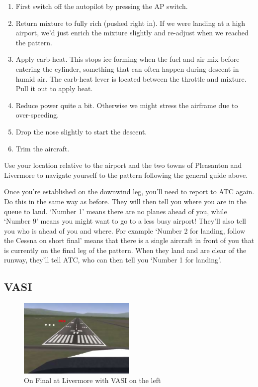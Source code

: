 \begin{enumerate}
\item First switch off the autopilot by pressing the AP switch.

\item Return mixture to fully rich (pushed right in). If we were landing at a
high airport, we'd just enrich the mixture slightly and re-adjust when we reached the pattern.

\item Apply carb-heat. This stops ice forming when the fuel and air mix before
entering the cylinder, something that can often happen during descent in humid air.
The carb-heat lever is located between the throttle and mixture. Pull it out to apply heat.

\item Reduce power quite a bit. Otherwise we might stress the airframe due to over-speeding.

\item Drop the nose slightly to start the descent.

\item Trim the aircraft.

\end{enumerate}

Use your location relative to the airport and the two towns of Pleasanton and
Livermore to navigate yourself to the pattern following the general guide above.

Once you're established on the downwind leg, you'll need to report to ATC again.
Do this in the same way as before. They will then tell you where you are in the
queue to land. `Number 1' means there are no planes ahead of you, while
`Number 9' means you might want to go to a less busy airport! They'll also
tell you who is ahead of you and where. For example `Number 2 for landing,
follow the Cessna on short final' means that there is a single aircraft in
front of you that is currently on the final leg of the pattern. When they land and are
clear of the runway, they'll tell ATC, who can then tell you `Number 1 for landing'.

\subsection{VASI}

\begin{figure}[!htp]
\centering
\includegraphics[width=0.5\textwidth]{vasi2}
\caption{On Final at Livermore with VASI on the left\label{vasi}}
\end{figure}

